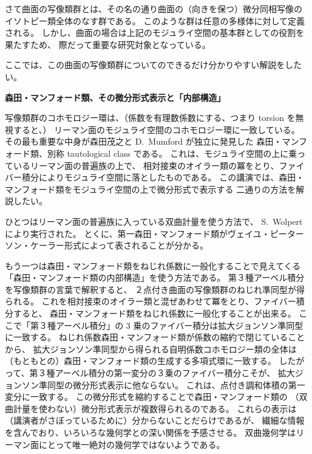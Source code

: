 \documentclass[uplatex,dvipdfmx]{jlreq}
\begin{document}
さて曲面の写像類群とは、その名の通り曲面の（向きを保つ）微分同相写像の
イソトピー類全体のなす群である。
このような群は任意の多様体に対して定義される。
しかし、曲面の場合は上記のモジュライ空間の基本群としての役割を果たすため、
際だって重要な研究対象となっている。

ここでは、この曲面の写像類群についてのできるだけ分かりやすい解説をしたい。

\newpage

\begin{center}
{\large\bfseries 森田・マンフォード類、その微分形式表示と「内部構造」}

\hspace*{\fill}{\large\bfseries 河澄 響矢（北大・理）}
\end{center}

\medskip

写像類群のコホモロジー環は、（係数を有理数係数にする、つまり torsion を無視すると、）
リーマン面のモジュライ空間のコホモロジー環に一致している。
その最も重要な中身が森田茂之と D.~Mumford が独立に発見した
森田・マンフォード類、別称 tautological class である。
これは、モジュライ空間の上に乗っているリーマン面の普遍族の上で、
相対接束のオイラー類の冪をとり、ファイバー積分によりモジュライ空間に落としたものである。
この講演では、森田・マンフォード類をモジュライ空間の上で微分形式で表示する
二通りの方法を解説したい。

ひとつはリーマン面の普遍族に入っている双曲計量を使う方法で、
S.~Wolpert により実行された。
とくに、第一森田・マンフォード類がヴェイユ・ピーターソン・ケーラー形式によって表されることが分かる。

もう一つは森田・マンフォード類をねじれ係数に一般化することで見えてくる
「森田・マンフォード類の内部構造」を使う方法である。
第３種アーベル積分を写像類群の言葉で解釈すると、
２点付き曲面の写像類群のねじれ準同型が得られる。
これを相対接束のオイラー類と混ぜあわせて冪をとり、ファイバー積分すると、
森田・マンフォード類をねじれ係数に一般化することが出来る。
ここで「第３種アーベル積分」の $3$ 乗のファイバー積分は拡大ジョンソン準同型に一致する。
ねじれ係数森田・マンフォード類が係数の縮約で閉じていることから、
拡大ジョンソン準同型から得られる自明係数コホモロジー類の全体は
（もともとの）森田・マンフォード類の生成する多項式環に一致する。
したがって、第３種アーベル積分の第一変分の３乗のファイバー積分こそが、
拡大ジョンソン準同型の微分形式表示に他ならない。
これは、点付き調和体積の第一変分に一致する。
この微分形式を縮約することで森田・マンフォード類の
（双曲計量を使わない）微分形式表示が複数得られるのである。
これらの表示は（講演者がさぼっているために）分からないことだらけであるが、
繊細な情報を含んでおり、いろいろな幾何学との深い関係を予感させる。
双曲幾何学はリーマン面にとって唯一絶対の幾何学ではないようである。
\end{document}
